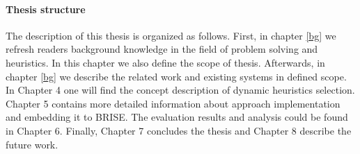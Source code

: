 \paragraph{Thesis structure}
The description of this thesis is organized as follows. First, in chapter \ref{bg} we refresh readers background knowledge in the field of problem solving and heuristics. In this chapter we also define the scope of thesis. Afterwards, in chapter \ref{bg} we describe the related work and existing systems in defined scope. In Chapter 4 one will find the concept description of dynamic heuristics selection. Chapter 5 contains more detailed information about approach implementation and  embedding it to BRISE. The evaluation results and analysis could be found in Chapter 6. Finally, Chapter 7 concludes the thesis and Chapter 8 describe the future work.

